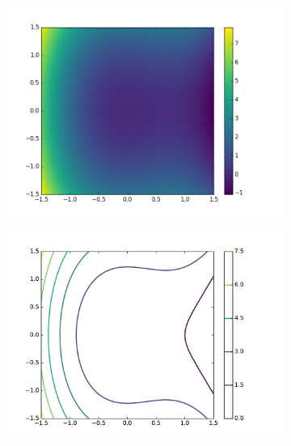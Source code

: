 \begin{figure}[H] %
\centering
\begin{subfigure}{.495\textwidth}
    \centering
    \includegraphics[width=\linewidth]{figures/heatmap_1.png}
\end{subfigure}
%
\begin{subfigure}{.495\textwidth}
    \centering
    \includegraphics[width=\linewidth]{figures/contour_1.pdf}
\end{subfigure}
\\
\begin{subfigure}{.495\textwidth}
    \centering

\end{subfigure}
\end{figure}
